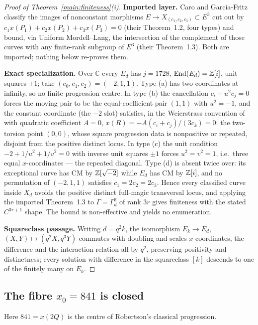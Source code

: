 \begin{proof}[Proof of Theorem~\ref{main:finiteness}(i)]
\textbf{Imported layer.} Caro and Garc\'ia-Fritz~\cite{CGF25} classify the
images of nonconstant morphisms $E\to X_{(c_1,c_2,c_3)}\subset E^3$ cut out
by $c_1x(P_1)+c_2x(P_2)+c_3x(P_3)=0$ (their Theorem~1.2, four types) and
bound, via Uniform Mordell--Lang, the intersection of the complement of
those curves with any finite-rank subgroup of $E^3$ (their Theorem~1.3).
Both are imported; nothing below re-proves them.

\textbf{Exact specialization.} Over $\mathbb C$ every $E_d$ has $j=1728$,
$\operatorname{End}(E_d)=\mathbb{Z}[i]$, unit squares $\pm1$; take
$(c_0,c_1,c_2)=(-2,1,1)$. Type (a) has two coordinates at infinity, so no
finite progression centre. In type (b) the cancellation $c_i+u^2c_j=0$ forces
the moving pair to be the equal-coefficient pair $(1,1)$ with $u^2=-1$, and
the constant coordinate (the $-2$ slot) satisfies, in the Weierstrass
convention of~\cite{CGF25} with quadratic coefficient $A=0$,
$x(R)=-A(c_i+c_j)/(3c_k)=0$: the two-torsion point $(0,0)$, whose square
progression data is nonpositive or repeated, disjoint from the positive
distinct locus. In type (c) the unit condition $-2+1/u^2+1/v^2=0$ with
inverse unit squares $\pm1$ forces $u^2=v^2=1$, i.e.\ three equal
$x$-coordinates --- the repeated diagonal. Type (d) is absent twice over:
its exceptional curve has CM by $\mathbb{Z}[\sqrt{-2}]$ while $E_d$ has CM by
$\mathbb{Z}[i]$, and no permutation of $(-2,1,1)$ satisfies $c_1=2c_2=2c_3$.
Hence every classified curve inside $X_d$ avoids the positive distinct
full-magic transversal locus, and applying the imported Theorem~1.3 to
$\Gamma=\Gamma_d^{3}$ of rank $3r$ gives finiteness with the stated
$C^{3r+1}$ shape. The bound is non-effective and yields no enumeration.

\textbf{Squareclass passage.} Writing $d=q^2k$, the isomorphism
$E_k\to E_d$, $(X,Y)\mapsto(q^2X,q^3Y)$ commutes with doubling and scales
$x$-coordinates, the difference and the interaction relation all by $q^2$,
preserving positivity and distinctness; every solution with difference in
the squareclass $[k]$ descends to one of the finitely many on $E_k$.
\end{proof}

\subsection{The fibre $x_0=841$ is closed}

Here $841=x(2Q)$ is the centre of Robertson's classical progression.

